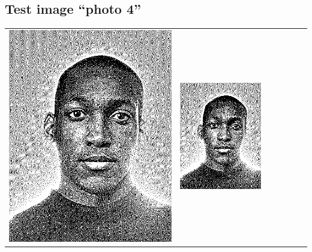 \subsection{Test image ``photo 4''}
\begin{tabular}{lllllll}
	\includegraphics{Ediphoto-4-1.png} &
	\includegraphics{Ediphoto-4-2.png} &

\end{tabular}
